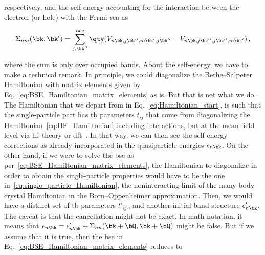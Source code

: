 \noindent respectively, and the self-energy accounting for the interaction between the electron (or hole) with the Fermi sea as

\begin{equation}
    \Sigma_{nm} (\bk,\bk') = \sum_{j,\bk''}^{\text{occ}}\qty(V_{n\bk,j\bk'',m\bk',j\bk''} - V_{n\bk,j\bk'',j\bk'',m\bk'})\,,
\end{equation}

\noindent where the sum is only over occupied bands.
About the self-energy, we have to make a technical remark.
In principle, we could diagonalize the Bethe--Salpeter Hamiltonian with matrix elements given by Eq.~\eqref{eq:BSE_Hamiltonian_matrix_elements} as is.
But that is not what we do.
The Hamiltonian that we depart from in Eq.~\eqref{eq:Hamiltonian_start}, is such that the single-particle part has \gls{tb} parameters $t_{i j}$ that come from diagonalizing the Hamiltonian~\eqref{eq:HF_Hamiltonian} including interactions, but at the mean-field level via \gls{hf}~theory or \gls{dft}~\cite{Ozfidan_2014}.
In that way, we can then see the self-energy corrections as already incorporated in the quasiparticle energies $\epsilon_{n \bk}$.
On the other hand, if we were to solve the \gls{bse} as per~\eqref{eq:BSE_Hamiltonian_matrix_elements}, the Hamiltonian to diagonalize in order to obtain the single-particle properties would have to be the one in~\eqref{eq:single_particle_Hamiltonian}, the noninteracting limit of the many-body crystal Hamiltonian in the Born--Oppenheimer approximation.
Then, we would have a distinct set of \gls{tb} parameters $t'_{i j}$\,, and another initial band structure $\epsilon'_{n \bk}$.
The caveat is that the cancellation might not be exact.
In math notation, it means that $\epsilon_{n \bk} = \epsilon'_{n \bk} + \Sigma_{n n}(\bk + \bQ, \bk + \bQ)$ might be false.
But if we assume that it is true, then the \gls{bse} in Eq.~\eqref{eq:BSE_Hamiltonian_matrix_elements} reduces to



